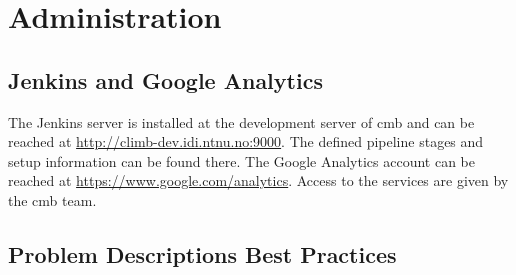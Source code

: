 \chapter{Administration}
\label{apdx:problems}

\section{Jenkins and Google Analytics}
The Jenkins server is installed at the development server of \gls{cmb} and can be reached at \url{http://climb-dev.idi.ntnu.no:9000}. The defined pipeline stages and setup information can be found there. The Google Analytics account can be reached at \url{https://www.google.com/analytics}. Access to the services are given by the \gls{cmb} team.

\section{Problem Descriptions Best Practices}

